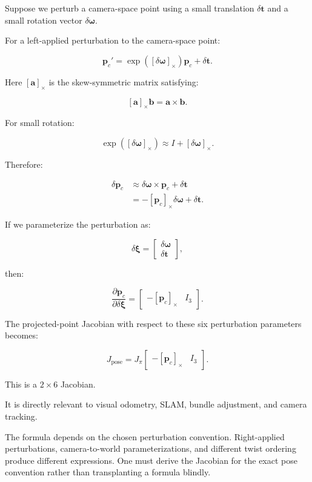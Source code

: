\hypertarget{02-foundations-ii-ch021-extending-the-chain-to-camera-pose-optimization}{}

Suppose we perturb a camera-space point using a small translation \(\delta\mathbf t\) and a small rotation vector \(\delta\boldsymbol\omega\).

For a left-applied perturbation to the camera-space point:

\[
\mathbf p_c' = \exp([\delta\boldsymbol\omega]_\times)\mathbf p_c +\delta\mathbf t.
\]

Here \([\mathbf a]_\times\) is the skew-symmetric matrix satisfying:

\[
[\mathbf a]_\times\mathbf b=\mathbf a\times\mathbf b.
\]

For small rotation:

\[
\exp([\delta\boldsymbol\omega]_\times) \approx I+[\delta\boldsymbol\omega]_\times.
\]

Therefore:

\[
\begin{aligned} \delta\mathbf p_c &\approx\delta\boldsymbol\omega\times\mathbf p_c +\delta\mathbf t\\ &=-[\mathbf p_c]_\times\delta\boldsymbol\omega +\delta\mathbf t. \end{aligned}
\]

If we parameterize the perturbation as:

\[
\delta\boldsymbol\xi= \begin{bmatrix} \delta\boldsymbol\omega\\ \delta\mathbf t \end{bmatrix},
\]

then:

\[
\frac{\partial\mathbf p_c} {\partial\delta\boldsymbol\xi} = \begin{bmatrix} -[\mathbf p_c]_\times&I_3 \end{bmatrix}.
\]

The projected-point Jacobian with respect to these six perturbation parameters becomes:

\[
\boxed{ J_{\text{pose}} = J_\pi \begin{bmatrix} -[\mathbf p_c]_\times&I_3 \end{bmatrix} }.
\]

This is a \(2\times6\) Jacobian.

It is directly relevant to visual odometry, SLAM, bundle adjustment, and camera tracking.

The formula depends on the chosen perturbation convention. Right-applied perturbations, camera-to-world parameterizations, and different twist ordering produce different expressions. One must derive the Jacobian for the exact pose convention rather than transplanting a formula blindly.

